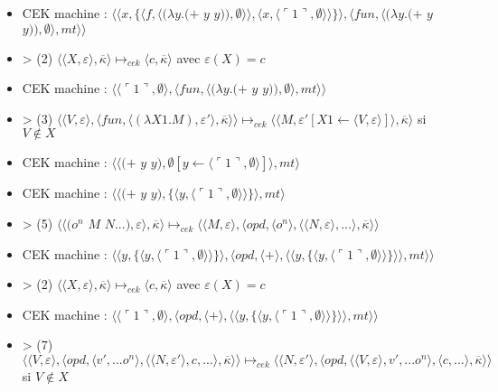 \documentclass[10pt,a4paper]{article}
\begin{document}
\begin{itemize}
					\item[] CEK machine : $\langle\langle x,\{\langle f,\langle(\lambda y.(+$ $y$ $y)),\emptyset\rangle\rangle,\langle x,\langle\ulcorner 1\urcorner,\emptyset\rangle\rangle\}\rangle,\langle fun,\langle(\lambda y.(+$ $y$ $y)),\emptyset\rangle,mt\rangle\rangle$	
					\item[] > (2) $\langle\langle X,\varepsilon\rangle,\overline{\kappa}\rangle \longmapsto_{cek} \langle c,\overline{\kappa}\rangle$ avec $\varepsilon(X) = c$
					\item[] CEK machine : $\langle \langle\ulcorner 1\urcorner,\emptyset\rangle,\langle fun,\langle(\lambda y.(+$ $y$ $y)),\emptyset\rangle,mt\rangle\rangle$	
					\item[] > (3) $\langle\langle V,\varepsilon\rangle,\langle fun,\langle (\lambda X1.M),\varepsilon'\rangle,\overline{\kappa} \rangle \rangle \longmapsto_{cek} \langle \langle M,\varepsilon'[X1 \leftarrow \langle V,\varepsilon\rangle]\rangle,\overline{\kappa}\rangle$ si $V \notin X$
					\item[] CEK machine : $\langle\langle(+$ $y$ $y),\emptyset[y \leftarrow\langle\ulcorner 1\urcorner,\emptyset\rangle]\rangle ,mt\rangle$
					\item[] CEK machine : $\langle\langle(+$ $y$ $y),\{\langle y,\langle\ulcorner 1\urcorner,\emptyset\rangle\rangle\}\rangle ,mt\rangle$
					\item[] > (5) $\langle\langle(o^{n}$ $M$ $N...),\varepsilon\rangle,\overline{\kappa}\rangle \longmapsto_{cek} \langle \langle M,\varepsilon\rangle,\langle opd,\langle o^{n}\rangle,\langle \langle N,\varepsilon\rangle,...\rangle,\overline{\kappa}\rangle\rangle$
					\item[] CEK machine : $\langle\langle y,\{\langle y,\langle\ulcorner 1\urcorner,\emptyset\rangle\rangle\}\rangle ,\langle opd,\langle+\rangle,\langle\langle y,\{\langle y,\langle\ulcorner 1\urcorner,\emptyset\rangle\rangle\}\rangle\rangle,mt\rangle\rangle$
					\item[] > (2) $\langle\langle X,\varepsilon\rangle,\overline{\kappa}\rangle \longmapsto_{cek} \langle c,\overline{\kappa}\rangle$ avec $\varepsilon(X) = c$
					\item[] CEK machine : $\langle\langle\ulcorner 1\urcorner,\emptyset\rangle,\langle opd,\langle+\rangle,\langle\langle y,\{\langle y,\langle\ulcorner 1\urcorner,\emptyset\rangle\rangle\}\rangle\rangle,mt\rangle\rangle$
					\item[] > (7) $\langle \langle V,\varepsilon\rangle,\langle opd,\langle v',...o^{n}\rangle,\langle  \langle N,\varepsilon'\rangle,c,...\rangle,\overline{\kappa}\rangle\rangle \longmapsto_{cek} \langle \langle N,\varepsilon'\rangle,\langle opd,\langle  \langle V,\varepsilon\rangle,v',...o^{n}\rangle,\langle c,...\rangle,\overline{\kappa}\rangle\rangle$ si $V \notin X$

\end{itemize}
\end{document}
